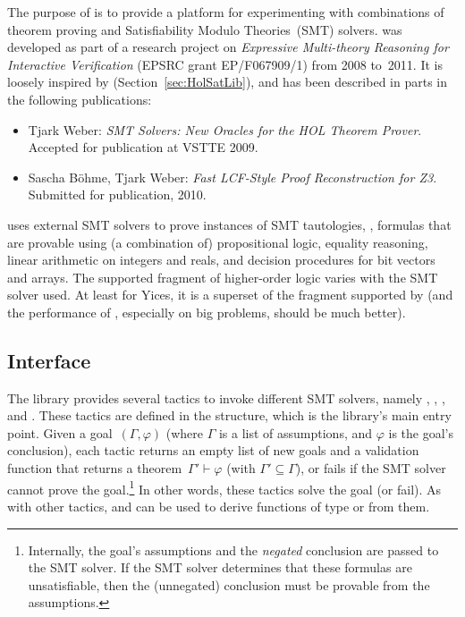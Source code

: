 
\setcounter{sessioncount}{0}

The purpose of  is to provide a platform for
experimenting with combinations of theorem proving and Satisfiability
Modulo Theories~(SMT) solvers.   was developed as part
of a research project on {\it Expressive Multi-theory Reasoning for
  Interactive Verification} (EPSRC grant EP/F067909/1) from 2008
to~2011.  It is loosely inspired by 
(Section~\ref{sec:HolSatLib}), and has been described in parts in the
following publications:
\begin{itemize}
\item Tjark Weber: {\it SMT Solvers: New Oracles for the HOL Theorem
  Prover}.  Accepted for publication at VSTTE 2009.%
\item Sascha B{\"o}hme, Tjark Weber: {\it Fast LCF-Style Proof
  Reconstruction for Z3}. Submitted for publication, 2010.%
\end{itemize}
 uses external SMT solvers to prove instances of SMT
tautologies, \ie, formulas that are provable using (a combination of)
propositional logic, equality reasoning, linear arithmetic on integers
and reals, and decision procedures for bit vectors and arrays.  The
supported fragment of higher-order logic varies with the SMT solver
used.  At least for Yices, it is a superset of the fragment supported
by  (and the performance of ,
especially on big problems, should be much better).

\subsection{Interface}

The library provides several tactics to invoke different SMT solvers,
namely , , , and
.  These tactics are defined in the 
structure, which is the library's main entry point.  Given a
goal~$(\Gamma, \varphi)$ (where $\Gamma$ is a list of assumptions, and
$\varphi$ is the goal's conclusion), each tactic returns an empty list
of new goals and a validation function that returns a theorem~$\Gamma'
\vdash \varphi$ (with $\Gamma' \subseteq \Gamma$), or fails if the SMT
solver cannot prove the goal.\footnote{Internally, the goal's
  assumptions and the \emph{negated} conclusion are passed to the SMT
  solver.  If the SMT solver determines that these formulas are
  unsatisfiable, then the (unnegated) conclusion must be provable from
  the assumptions.}  In other words, these tactics solve the goal (or
fail).  As with other tactics,  and
 can be used to derive functions of type  or  from them.

